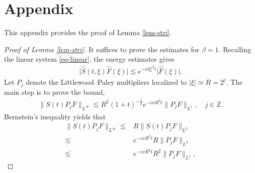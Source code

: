 \documentclass[12pt]{article}
\def\d{\mathrm{d}}
\numberwithin{equation}{section}
\begin{document}
    \section{Appendix}
    This appendix provides the proof of Lemma \ref{lem-stri}.
    \begin{proof}[Proof of Lemma \ref{lem-stri}]
        It suffices to prove the estimates for $\beta=1$. Recalling the linear system \eqref{eq-linear}, the energy estimates gives 
        \begin{align}\label{est-ener}
  		\big|\hat{S}(t,\xi)\hat{F}(\xi)\big|\lesssim e^{-\nu |\xi|^2 t}\big| \hat{F}(\xi)\big|.
  	    \end{align}
    Let $P_j$ denote the Littlewood--Paley multipliers localized to
  	\(|\xi|\simeq R=2^j\). The main step is to prove the bound, 
    \begin{align}\label{est-p}
        \|S(t)P_jF\|_{L^\infty}\lesssim R^2(1+t)^{-\frac{1}{2}} e^{-c\nu R^2t}\|P_jF\|_{L^1},\quad j\in\mathbb{Z}.
    \end{align}
    Bernstein's inequality yields that
  		\begin{equation} \label{est-1}
  		    \begin{aligned}
  			\|S(t)P_jF\|_{L^{\infty}}\lesssim& R\| S(t)P_j F\|_{L^2}\\
  			\lesssim& e^{-c\nu R^2 t}R\|P_j F\|_{L^2}\\
  			\lesssim& e^{-c\nu R^2 t}R^2 \|P_j F\|_{L^1},
  		\end{aligned}
  		\end{equation}

\end{proof}
\end{document}
